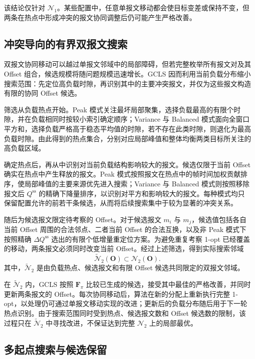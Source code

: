 \documentclass[UTF8,a4paper,twoside,zihao=-4]{ctexart}
\numberwithin{equation}{section}
\numberwithin{figure}{section}
\numberwithin{table}{section}
\theoremstyle{definition}
\numberwithin{algocf}{section}
\begin{document}
该结论仅针对 $\mathcal N_1$。某些配置中，任意单报文移动都会使目标变差或保持不变，但两条在热点中形成冲突的报文协同调整后仍可能产生严格改善。

\subsection{冲突导向的有界双报文搜索}
\label{subsec:gcls-pair}

双报文协同移动可以越过单报文邻域中的局部障碍，但若完整枚举所有报文对及其 Offset 组合，候选规模将随问题规模迅速增长。GCLS 因而利用当前负载分布缩小搜索范围：先定位高负载时隙，再识别其中的主要冲突报文，并仅为这些报文构造有限的协同 Offset 候选。

筛选从负载热点开始。Peak 模式关注最坏局部聚集，选择负载最高的有限个时隙，并在负载相同时按较小索引确定顺序；Variance 与 Balanced 模式面向全窗口平方和，选择负载严格高于稳态平均值的时隙，若不存在此类时隙，则退化为最高负载时隙。由此得到的热点集合，分别对应局部峰值和整体均衡两类目标所关注的高负载区域。

确定热点后，再从中识别对当前负载结构影响较大的报文。候选仅限于当前 Offset 确实在热点中产生释放的报文。Peak 模式按照报文在热点中的帧时间加权贡献排序，使局部峰值的主要来源优先进入搜索；Variance 与 Balanced 模式则按照移除报文后 $Q^{\mathrm{ss}}$ 的精确下降量排序，以识别对平方和影响较大的报文。每种模式均只保留配置允许的前若干条候选，从而将后续搜索集中于较为显著的冲突关系。

随后为候选报文限定待考察的 Offset。对于候选报文 $m_i$ 与 $m_j$，候选值包括各自当前 Offset 周围的合法邻点、二者当前 Offset 的合法互换，以及非 Peak 模式下按照精确 $\Delta Q^{\mathrm{ss}}$ 选出的有限个低增量重定位方案。为避免重复考察 1-opt 已经覆盖的移动，两条报文必须同时改变当前 Offset。经过上述筛选，得到实际搜索邻域
\begin{equation}
 \widetilde{\mathcal N}_2(\symbf O)
 \subset
 \mathcal N_2(\symbf O).
\label{eq:gcls-bounded-pair-neighborhood}
\end{equation}
其中，$\widetilde{\mathcal N}_2$ 是由负载热点、候选报文和有限 Offset 候选共同限定的双报文邻域。

在 $\widetilde{\mathcal N}_2$ 内，GCLS 按照 $\symbf F_{\pi}$ 比较已生成的候选，接受其中最佳的严格改善，并同时更新两条报文的 Offset。每次协同移动后，算法在新的分配上重新执行完整 1-opt，以处理仍可通过单报文移动实现的改进；更新后的负载分布随后用于下一轮热点识别。由于搜索范围同时受到热点、候选报文数和 Offset 候选数的限制，该过程只在 $\widetilde{\mathcal N}_2$ 中寻找改进，不保证达到完整 $\mathcal N_2$ 上的局部最优。
\subsection{多起点搜索与候选保留}
\label{subsec:gcls-restart-pool}
\end{document}

